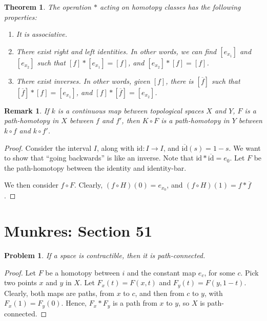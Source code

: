 \documentclass[10pt, oneside]{amsart}
\newtheorem{thm}{Theorem}
\newtheorem{rem}{Remark}
\newtheorem{prob}{Problem}
\begin{document}
    \begin{thm}
      The operation $*$ acting on homotopy classes has the following properties:

      \begin{enumerate}
      \item It is associative.
      \item There exist right and left identities. In other words, we can find $[e_{x_1}]$ and $[e_{x_2}]$ such that $[f] * [e_{x_1}] = [f]$, and $[e_{x_2}] * [f] = [f]$.
        \item There exist inverses. In other words, given $[f]$, there is $[\overline{f}]$ such that $[\overline{f}] * [f] = [e_{x_1}]$, and $[f] * [\overline{f}] = [e_{x_2}]$.
      \end{enumerate}

    \end{thm}

    \begin{rem}
      If $k$ is a continuous map between topological spaces $X$ and $Y$, $F$ is a path-homotopy in $X$ between $f$ and $f'$, then
      $K \circ F$ is a path-homotopy in $Y$ between $k \circ f$ and $k \circ f'$.
    \end{rem}

    \begin{proof}
      Consider the interval $I$, along with $\text{id} : I \rightarrow I$, and $\overline{\text{id}}(s) = 1 - s$. We want
      to show that ``going backwards'' is like an inverse. Note that $\text{id} * \overline{\text{id}} = e_0$. Let $F$
      be the path-homotopy between the identity and identity-bar.
      \newline

      We then consider $f \circ F$. Clearly, $(f \circ H)(0) = e_{x_0}$, and $(f \circ H)(1) = f * \overline{f}$.
    \end{proof}

    \section{Munkres: Section 51}

    \begin{prob}
      If a space is contractible, then it is path-connected.
    \end{prob}

    \begin{proof}
      Let $F$ be a homotopy between $i$ and the constant map $e_c$, for some $c$. Pick two points $x$ and $y$ in $X$. Let $F_x(t) = F(x, t)$ and $F_y(t) = F(y, 1 - t)$. Clearly,
      both maps are paths, from $x$ to $c$, and then from $c$ to $y$, with $F_x(1) = F_y(0)$. Hence, $F_x * F_y$ is a path from $x$ to $y$, so $X$ is path-connected.
    \end{proof}
\end{document}
